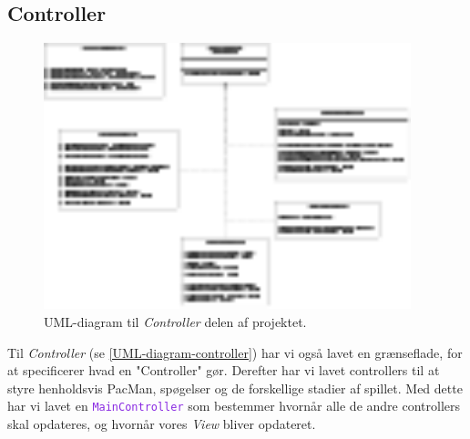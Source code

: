 \documentclass{article}
\newcommand{\class}[1]{\textcolor{BlueViolet}{\small\texttt{#1}}}
\theoremstyle{mytheoremstyle}
\theoremstyle{mytheoremstyle}
\theoremstyle{myproblemstyle}
\begin{document}
\subsection{Controller}\label{sub:Controller} %
\begin{figure}[H]
    \begin{center}
        \includegraphics[width=0.95\textwidth]{figures/UML-diagram-controller.png}
    \end{center}
    \caption{UML-diagram til \textit{Controller} delen af projektet.}
    \label{UML-diagram-controller}
\end{figure}

Til \textit{Controller} (se \autoref{UML-diagram-controller}) har vi også lavet
en grænseflade, for at specificerer hvad en "Controller" gør. Derefter har vi
lavet controllers til at styre henholdsvis PacMan, spøgelser og de forskellige
stadier af spillet. Med dette har vi lavet en \class{MainController} som
bestemmer hvornår alle de andre controllers skal opdateres, og hvornår vores
\textit{View} bliver opdateret.
\end{document}
